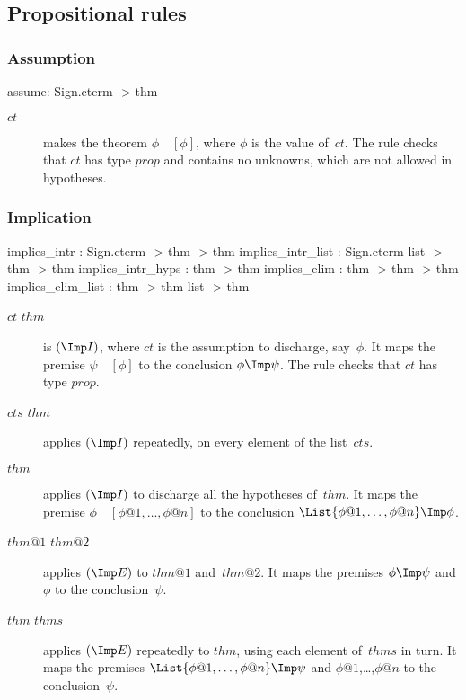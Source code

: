 \subsection{Propositional rules}
\subsubsection{Assumption}
\begin{ttbox} 
assume: Sign.cterm -> thm
\end{ttbox}
\begin{description}
\item[ $ct$] 
makes the theorem \(\phi \quad[\phi]\), where $\phi$ is the value of~$ct$.
The rule checks that $ct$ has type $prop$ and contains no unknowns, which
are not allowed in hypotheses.
\end{description}

\subsubsection{Implication}
\begin{ttbox} 
implies_intr      : Sign.cterm -> thm -> thm
implies_intr_list : Sign.cterm list -> thm -> thm
implies_intr_hyps : thm -> thm
implies_elim      : thm -> thm -> thm
implies_elim_list : thm -> thm list -> thm
\end{ttbox}
\begin{description}
\item[ $ct$ $thm$] 
is $({\Imp}I)$, where $ct$ is the assumption to discharge, say~$\phi$.  It
maps the premise $\psi\quad[\phi]$ to the conclusion $\phi\Imp\psi$.  The
rule checks that $ct$ has type $prop$.

\item[ $cts$ $thm$] 
applies $({\Imp}I)$ repeatedly, on every element of the list~$cts$.

\item[ $thm$] 
applies $({\Imp}I)$ to discharge all the hypotheses of~$thm$.  It maps the
premise $\phi \quad [\phi@1,\ldots,\phi@n]$ to the conclusion
$\List{\phi@1,\ldots,\phi@n}\Imp\phi$.

\item[ $thm@1$ $thm@2$] 
applies $({\Imp}E)$ to $thm@1$ and~$thm@2$.  It maps the premises $\phi\Imp
\psi$ and $\phi$ to the conclusion~$\psi$.

\item[ $thm$ $thms$] 
applies $({\Imp}E)$ repeatedly to $thm$, using each element of~$thms$ in
turn.  It maps the premises $\List{\phi@1,\ldots,\phi@n}\Imp\psi$ and
$\phi@1$,\ldots,$\phi@n$ to the conclusion~$\psi$.
\end{description}

